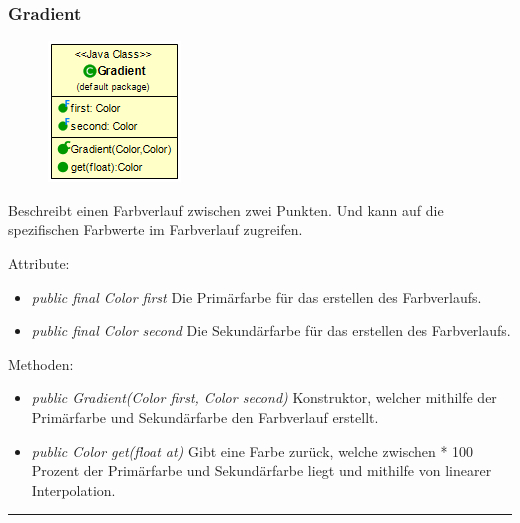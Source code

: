 \subsubsection{Gradient} 
\begin{minipage}{0.3\textwidth}
    \begin{figure}[H]
    {\centering\includegraphics[scale = 0.6
    ]{media/view/theme/Gradient_Class.png}}
    \end{figure}
    \end{minipage} \hfill
    \begin{minipage}{0.6\textwidth}
    Beschreibt einen Farbverlauf zwischen zwei Punkten. Und kann auf die spezifischen Farbwerte im Farbverlauf zugreifen.
    \end{minipage}
    \vspace{\baselineskip}
Attribute: \begin{itemize} [noitemsep]
     \item \emph{public final Color first} Die Primärfarbe für das erstellen des Farbverlaufs.
    \item \emph{public final Color second} Die Sekundärfarbe für das erstellen des Farbverlaufs.
\end{itemize}
Methoden: \begin{itemize} [noitemsep]
    \item \emph{public Gradient(Color first, Color second)} Konstruktor, welcher mithilfe der Primärfarbe und Sekundärfarbe den Farbverlauf erstellt.
    \item \emph{public Color get(float at)} Gibt eine Farbe zurück, welche zwischen * 100 Prozent der Primärfarbe und Sekundärfarbe liegt und mithilfe von linearer Interpolation.
\end{itemize}

\rule{\textwidth}{0.4pt}